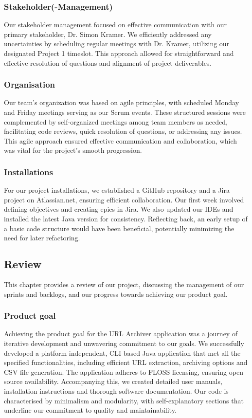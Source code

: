 \subsubsection{Stakeholder(-Management)}
Our stakeholder management focused on effective communication with our primary stakeholder, Dr. Simon Kramer.
We efficiently addressed any uncertainties by scheduling regular meetings with Dr. Kramer, utilizing our designated Project 1 timeslot.
This approach allowed for straightforward and effective resolution of questions and alignment of project deliverables.

\subsubsection{Organisation}
Our team's organization was based on agile principles, with scheduled Monday and Friday meetings serving as our Scrum events.
These structured sessions were complemented by self-organized meetings among team members as needed, facilitating code reviews, quick resolution of questions, or addressing any issues.
This agile approach ensured effective communication and collaboration, which was vital for the project's smooth progression.

\subsubsection{Installations}
For our project installations, we established a GitHub repository and a Jira project on Atlassian.net, ensuring efficient collaboration.
Our first week involved defining objectives and creating epics in Jira.
We also updated our IDEs and installed the latest Java version for consistency.
Reflecting back, an early setup of a basic code structure would have been beneficial, potentially minimizing the need for later refactoring.

\subsection{Review}
This chapter provides a review of our project, discussing the management of our sprints and backlogs, and our progress towards achieving our product goal.

\subsubsection{Product goal}
Achieving the product goal for the URL Archiver application was a journey of iterative development and unwavering commitment to our goals.
We successfully developed a platform-independent, CLI-based Java application that met all the specified functionalities, including efficient URL extraction, archiving options and CSV file generation.
The application adheres to FLOSS licensing, ensuring open-source availability.
Accompanying this, we created detailed user manuals, installation instructions and thorough software documentation.
Our code is characterised by minimalism and modularity, with self-explanatory sections that underline our commitment to quality and maintainability.

